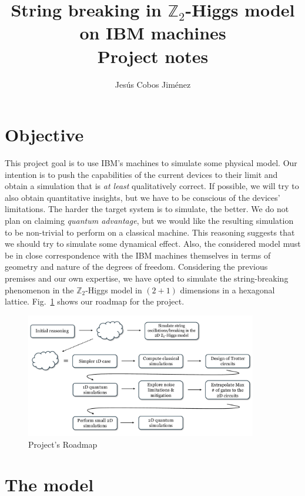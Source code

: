 \documentclass[a4paper]{article}
\title{String breaking in $\mathbb{Z}_2$-Higgs model on IBM machines \\[15pt]
       \large Project notes}
\author{Jesús Cobos Jiménez}
\begin{document}
\maketitle

\section{Objective}

This project goal is to use IBM's machines to simulate some physical model. Our intention is to push the capabilities of the current devices to their limit and obtain a simulation that is \textit{at least} qualitatively correct. If possible, we will try to also obtain quantitative insights, but we have to be conscious of the devices' limitations. The harder the target system is to simulate, the better. We do not plan on claiming \textit{quantum advantage}, but we would like the resulting simulation to be non-trivial to perform on a classical machine. This reasoning suggests that we should try to simulate some dynamical effect. Also, the considered model must be in close correspondence with the IBM machines themselves in terms of geometry and nature of the degrees of freedom. Considering the previous premises and our own expertise, we have opted to simulate the string-breaking phenomenon in the $\mathbb{Z}_2$-Higgs model in $(2+1)$ dimensions in a hexagonal lattice. Fig.~\ref{fig:roadmap} shows our roadmap for the project.

\begin{figure}[!ht]
    \centering
    \includegraphics[width=0.9\textwidth]{Roadmap.pdf}
    \caption{Project's Roadmap}
    \label{fig:roadmap}
\end{figure}

\section{The model}
\end{document}

